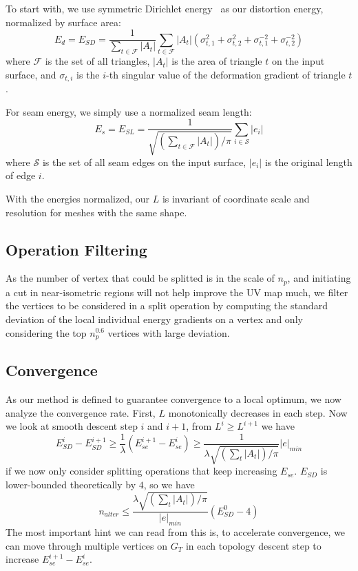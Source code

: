 To start with, we use symmetric Dirichlet energy~\cite{Smith2015Bijective} as our distortion energy, normalized by surface area:
\[ E_d = E_{SD} = \frac{1}{\sum_{t\in\mathcal{F}} |A_t|} \sum_{t\in\mathcal{F}} |A_t|(\sigma_{t,1}^2 + \sigma_{t,2}^2 + \sigma_{t,1}^{-2} + \sigma_{t,2}^{-2}) \]
where $\mathcal{F}$ is the set of all triangles, $|A_t|$ is the area of triangle $t$ on the input surface, and $\sigma_{t,i}$ is the $i$-th singular value of the deformation gradient of triangle $t$.

For seam energy, we simply use a normalized seam length:
\[ E_s = E_{SL} = \frac{1}{\sqrt{(\sum_{t\in\mathcal{F}} |A_t|)/\pi}} \sum_{i \in \mathcal{S}} |e_i| \]
where $\mathcal{S}$ is the set of all seam edges on the input surface, $|e_i|$ is the original length of edge $i$.

With the energies normalized, our $L$ is invariant of coordinate scale and resolution for meshes with the same shape.





\subsection{Operation Filtering}
\label{sec:operationFiltering}
As the number of vertex that could be splitted is in the scale of $n_p$, and initiating a cut in near-isometric regions will not help improve the UV map much, we filter the vertices to be considered in a split operation by computing the standard deviation of the local individual energy gradients on a vertex and only considering the top $n_p^{0.6}$ vertices with large deviation. 

\subsection{Convergence}
\label{sec:convergence}


As our method is defined to guarantee convergence to a local optimum, we now analyze the convergence rate. First, $L$ monotonically decreases in each step. Now we look at smooth descent step $i$ and $i+1$, from $L^i \geq L^{i+1}$ we have
\[ E^i_{SD} - E^{i+1}_{SD} \geq \frac{1}{\lambda} (E^{i+1}_{se} - E^i_{se}) \geq \frac{1}{\lambda\sqrt{(\sum_t |A_t|)/\pi}} |e|_{min} \]
if we now only consider splitting operations that keep increasing $E_{se}$. $E_{SD}$ is lower-bounded theoretically by $4$, so we have
\[ n_{alter} \leq \frac{\lambda\sqrt{(\sum_t |A_t|)/\pi}}{|e|_{min}} (E^0_{SD} - 4) \]
The most important hint we can read from this is, to accelerate convergence, we can move through multiple vertices on $G_T$ in each topology descent step to increase $E^{i+1}_{se} - E^i_{se}$.

 